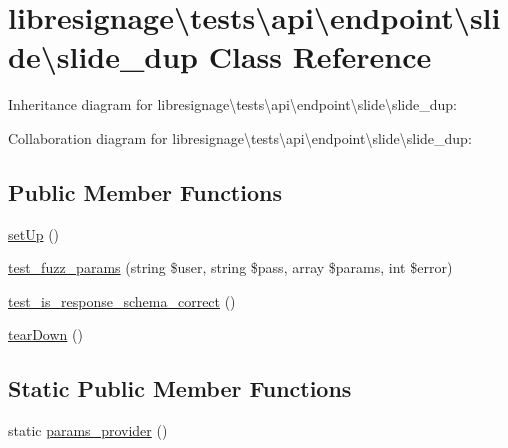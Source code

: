 \hypertarget{classlibresignage_1_1tests_1_1api_1_1endpoint_1_1slide_1_1slide__dup}{}\section{libresignage\textbackslash{}tests\textbackslash{}api\textbackslash{}endpoint\textbackslash{}slide\textbackslash{}slide\+\_\+dup Class Reference}
\label{classlibresignage_1_1tests_1_1api_1_1endpoint_1_1slide_1_1slide__dup}


Inheritance diagram for libresignage\textbackslash{}tests\textbackslash{}api\textbackslash{}endpoint\textbackslash{}slide\textbackslash{}slide\+\_\+dup\+:


Collaboration diagram for libresignage\textbackslash{}tests\textbackslash{}api\textbackslash{}endpoint\textbackslash{}slide\textbackslash{}slide\+\_\+dup\+:
\subsection*{Public Member Functions}
\begin{DoxyCompactItemize}
\item 
\hyperlink{classlibresignage_1_1tests_1_1api_1_1endpoint_1_1slide_1_1slide__dup_a1fc39a2a89fd46c4dbc08691fc1d5ae9}{set\+Up} ()
\item 
\hyperlink{classlibresignage_1_1tests_1_1api_1_1endpoint_1_1slide_1_1slide__dup_a5f3fdb3a2a4c5c74dca28f18c261eda8}{test\+\_\+fuzz\+\_\+params} (string \$user, string \$pass, array \$params, int \$error)
\item 
\hyperlink{classlibresignage_1_1tests_1_1api_1_1endpoint_1_1slide_1_1slide__dup_a50c3b17a032e592785f502bbacc7e99c}{test\+\_\+is\+\_\+response\+\_\+schema\+\_\+correct} ()
\item 
\hyperlink{classlibresignage_1_1tests_1_1api_1_1endpoint_1_1slide_1_1slide__dup_a1986228d4b91a18a2e26e9062c637197}{tear\+Down} ()
\end{DoxyCompactItemize}
\subsection*{Static Public Member Functions}
\begin{DoxyCompactItemize}
\item 
static \hyperlink{classlibresignage_1_1tests_1_1api_1_1endpoint_1_1slide_1_1slide__dup_a949f05abf135705ee2abdc426756f7fa}{params\+\_\+provider} ()
\end{DoxyCompactItemize}
